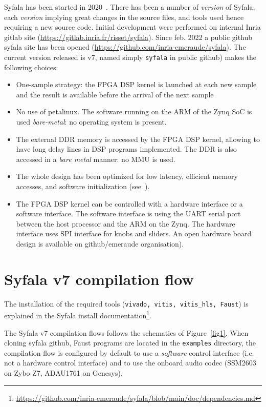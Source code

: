\documentclass[11pt]{article}
\numberwithin{equation}{section}
\numberwithin{figure}{section}
\newcommand{\syfala}{{Syfala}\xspace}
\begin{document}
Syfala has been started in 2020~\cite{Risset20,SMC22}.  There has been a number of {\em version} of Syfala, each {\em version} implying great changes in the source files, and tools used hence requiring a new source code. Initial development were performed on internal Inria gitlab site (\url{https://gitlab.inria.fr/risset/syfala}). Since feb. 2022 a public github syfala site has been opened (\url{https://github.com/inria-emeraude/syfala}). The current version released is v7, named simply {\tt syfala} in public github) makes the following choices:
\begin{itemize}
\item One-sample strategy: the FPGA DSP kernel is launched at each new sample and the result is available before the arrival of the next sample
\item No use of petalinux. The software running on the ARM of the Zynq SoC is used {\em bare-metal}: no operating system is present.
\item The external DDR memory is accessed by the FPGA DSP kernel, allowing to have long delay lines in DSP programs implemented. The DDR is also accessed in a {\em bare metal} manner: no MMU is used.
\item The whole design has been optimized for low latency, efficient memory accesses, and software initialization  (see~\cite{SMC22}).
\item The FPGA DSP kernel can be controlled with a hardware interface or a software interface. The software interface is using the UART serial port between the host processor and the ARM on the Zynq. The hardware interface uses SPI interface for knobs and sliders. An open hardware board design is available on github/emeraude organisation).
\end{itemize}
\newpage

\section{Syfala v7 compilation flow}
\label{syfala1}
The installation of the required tools ({\tt vivado, vitis, vitis\_hls, Faust}) is explained in the Syfala install documentation\footnote{\href{https://github.com/inria-emeraude/syfala/blob/main/doc/dependencies.md}{https://github.com/inria-emeraude/syfala/blob/main/doc/dependencies.md}}.

The  \syfala v7 compilation flows  follows the schematics of Figure~\ref{fig1}. When cloning syfala github, Faust programs are located in the {\tt examples} directory, the compilation flow is configured by default to use a {\em software} control interface (i.e. not a hardware control interface) and to use the onboard audio codec (SSM2603 on Zybo Z7, ADAU1761 on Genesys). 
\end{document}
